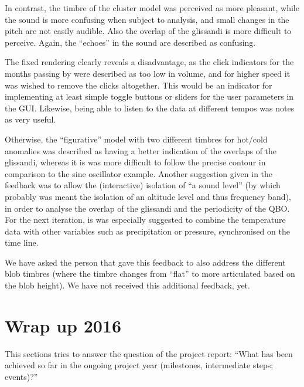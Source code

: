 \documentclass[11pt,a4paper]{article}
\begin{document}
In contrast, the timbre of the cluster model was perceived as more pleasant, while the sound is more confusing when subject to analysis, and small changes in the pitch are not easily audible. Also the overlap of the glissandi is more difficult to perceive. Again, the ``echoes'' in the sound are described as confusing.

The fixed rendering clearly reveals a disadvantage, as the click indicators for the months passing by were described as too low in volume, and for higher speed it was wished to remove the clicks altogether. This would be an indicator for implementing at least simple toggle buttons or sliders for the user parameters in the GUI. Likewise, being able to listen to the data at different tempos was notes as very useful.

Otherwise, the ``figurative'' model with two different timbres for hot/cold anomalies was described as having a better indication of the overlaps of the glissandi, whereas it is was more difficult to follow the precise contour in comparison to the sine oscillator example. Another suggestion given in the feedback was to allow the (interactive) isolation of ``a sound level'' (by which probably was meant the isolation of an altitude level and thus frequency band), in order to analyse the overlap of the glissandi and the periodicity of the QBO. For the next iteration, is was especially suggested to combine the temperature data with other variables such as precipitation or pressure, synchronised on the time line.

We have asked the person that gave this feedback to also address the different blob timbres (where the timbre changes from ``flat'' to more articulated based on the blob height). We have not received this additional feedback, yet.

\section{Wrap up 2016}

This sections tries to answer the question of the project report: ``What has been achieved so far in the ongoing project year (milestones, intermediate steps; events)?''
\end{document}
